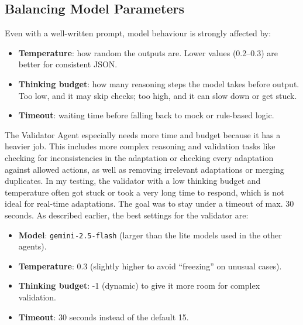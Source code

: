 \documentclass[openany]{book}
\begin{document}
\subsection{Balancing Model Parameters}
Even with a well-written prompt, model behaviour is strongly affected by:
\begin{itemize}
    \item \textbf{Temperature}: how random the outputs are. Lower values (0.2–0.3) are better for consistent JSON.
    \item \textbf{Thinking budget}: how many reasoning steps the model takes before output. Too low, and it may skip checks; too high, and it can slow down or get stuck.
    \item \textbf{Timeout}: waiting time before falling back to mock or rule-based logic.
\end{itemize}
The Validator Agent especially needs more time and budget because it has a heavier job. This includes more complex reasoning and validation tasks like checking for inconsistencies in the adaptation or checking every adaptation against allowed actions, as well as removing irrelevant adaptations or merging duplicates.
In my testing, the validator with a low thinking budget and temperature often got stuck or took a very long time to respond, which is not ideal for real-time adaptations. The goal was to stay under a timeout of max. 30 seconds.
As described earlier, the best settings for the validator are:
\begin{itemize}
    \item \textbf{Model}: \texttt{gemini-2.5-flash} (larger than the lite models used in the other agents).
    \item \textbf{Temperature}: 0.3 (slightly higher to avoid “freezing” on unusual cases).
    \item \textbf{Thinking budget}: -1 (dynamic) to give it more room for complex validation.
    \item \textbf{Timeout}: 30 seconds instead of the default 15.
\end{itemize}
\end{document}
